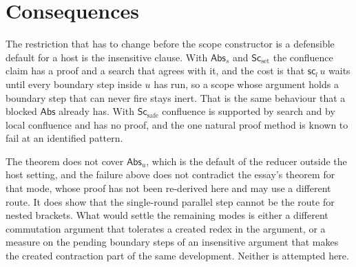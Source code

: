 \documentclass[11pt]{article}
\theoremstyle{definition}
\newcommand{\Sc}{\mathsf{Sc}}
\newcommand{\Abs}{\mathsf{Abs}}
\newcommand{\scn}[1]{\mathsf{sc}_{#1}}
\begin{document}
\section{Consequences}

The restriction that has to change before the scope constructor is a defensible default for a host is the insensitive clause. With $\Abs_s$ and $\Sc_{\mathrm{set}}$ the confluence claim has a proof and a search that agrees with it, and the cost is that $\scn{l}\,u$ waits until every boundary step inside $u$ has run, so a scope whose argument holds a boundary step that can never fire stays inert. That is the same behaviour that a blocked $\Abs$ already has. With $\Sc_{\mathrm{safe}}$ confluence is supported by search and by local confluence and has no proof, and the one natural proof method is known to fail at an identified pattern.

The theorem does not cover $\Abs_u$, which is the default of the reducer outside the host setting, and the failure above does not contradict the essay's theorem for that mode, whose proof has not been re-derived here and may use a different route. It does show that the single-round parallel step cannot be the route for nested brackets. What would settle the remaining modes is either a different commutation argument that tolerates a created redex in the argument, or a measure on the pending boundary steps of an insensitive argument that makes the created contraction part of the same development. Neither is attempted here.
\end{document}
